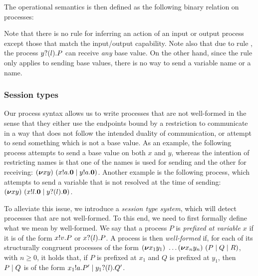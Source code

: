 The operational semantics is then defined as the following binary relation on processes:
Note that there is no rule for inferring an action of an input or output process except those that match the input/output capability.
Note also that due to rule , the process \( y ? (l) . P \) can receive \emph{any} base value.
On the other hand, since the rule  only applies to sending base values, there is no way to send a variable name or a name.

\subsubsection{Session types}
Our process syntax allows us to write processes that are not well-formed in the sense that they either use the endpoints bound by a restriction to communicate in a way that does not follow the intended duality of communication, or attempt to send something which is not a base value.
As an example, the following process attempts to send a base value on both \( x \) and \( y\), whereas the intention of restricting names is that one of the names is used for sending and the other for receiving: \( (\bm{\nu} xy)~(x ! a . \bm{0} \mid y ! a . \bm{0}) \).
Another example is the following process, which attempts to send a variable that is not resolved at the time of sending: \( (\bm{\nu} xy)~(x ! l . \bm{0} \mid y ? (l) . \bm{0}) \).

To alleviate this issue, we introduce a \emph{session type system}, which will detect processes that are not well-formed.
To this end, we need to first formally define what we mean by well-formed.
We say that a process \( P \) is \emph{prefixed at variable \( x \)} if it is of the form \( x ! v . P \) or \( x ? (l) . P \).
A process is then \emph{well-formed} if, for each of its structurally congruent processes of the form \( (\bm{\nu} x_1y_1)~\dots (\bm{\nu} x_ny_n)~(P \mid Q \mid R) \), with \( n \geq 0 \), it holds that, if \( P \) is prefixed at \( x_1 \) and \( Q \) is prefixed at \( y_1 \), then \( P \mid Q \) is of the form \( x_1 ! a . P' \mid y_1 ? (l) . Q' \).

